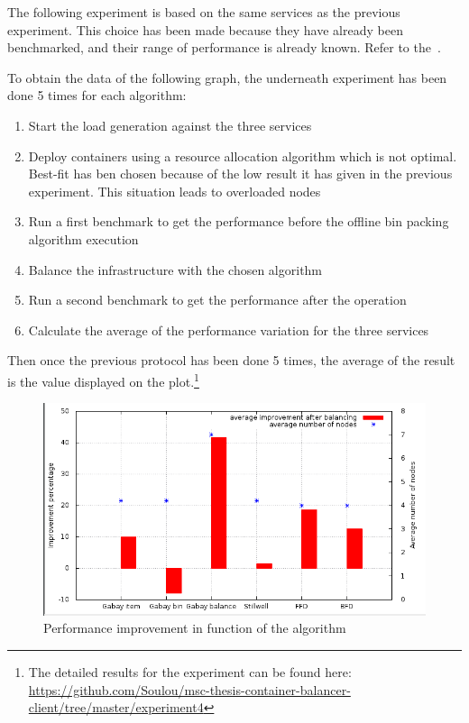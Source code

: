 The following experiment is based on the same services as the previous
experiment. This choice has been made because they have already been
benchmarked, and their range of performance is already known.  Refer to
the~.

To obtain the data of the following graph, the underneath experiment has been done 5
times for each algorithm:

\begin{enumerate}
	\item{Start the load generation against the three services}
	\item{Deploy containers using a resource allocation algorithm which is not
	optimal. Best-fit has ben chosen because of the low result it has given in
	the previous experiment. This situation leads to overloaded nodes}
	\item{Run a first benchmark to get the performance before the offline bin
	packing algorithm execution}
	\item{Balance the infrastructure with the chosen algorithm}
	\item{Run a second benchmark to get the performance after the operation}
	\item{Calculate the average of the performance variation for the three services}
\end{enumerate}

Then once the previous protocol has been done 5 times, the average of the
result is the value displayed on the plot.\footnote{The detailed results for
the experiment can be found here:
\url{https://github.com/Soulou/msc-thesis-container-balancer-client/tree/master/experiment4}}

\begin{figure}[h!]
	\includegraphics[width=\textwidth]{./Images/BinPacking/exp4_improvement.png}
	\caption{Performance improvement in function of the algorithm}
\end{figure}

